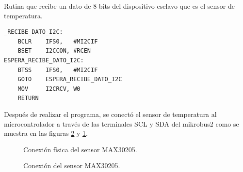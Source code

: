Rutina que recibe un dato de 8 bits del dispositivo esclavo que es el sensor de temperatura.
{\small
\begin{lstlisting}[frame=single]
_RECIBE_DATO_I2C:
	BCLR	IFS0,	#MI2CIF
	BSET	I2CCON,	#RCEN
ESPERA_RECIBE_DATO_I2C:
	BTSS	IFS0,	#MI2CIF
	GOTO	ESPERA_RECIBE_DATO_I2C
	MOV		I2CRCV,	W0	
	RETURN
\end{lstlisting}
}

Después de realizar el programa, se conectó el sensor de temperatura al microcontrolador a través de las terminales SCL y SDA del mikrobus2 como se muestra en las figuras \ref{fig:ConexionMAX30205} y \ref{fig:ConexionFisicaMAX30205}.\\

\begin{figure}[htbp!]
	\centering
	\caption{Conexión física del sensor MAX30205.}
	\label{fig:ConexionFisicaMAX30205}
\end{figure}

\begin{figure}[htbp!]
	\centering
	\caption{Conexión del sensor MAX30205.}
	\label{fig:ConexionMAX30205}
\end{figure}

